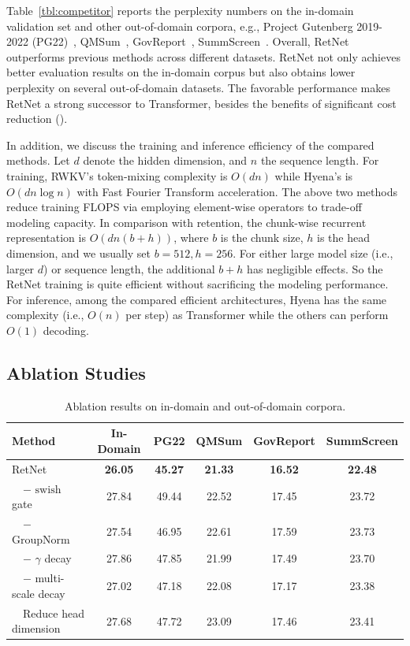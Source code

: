 \documentclass{article}
\newcommand\our{RetNet}
\begin{document}
Table~\ref{tbl:competitor} reports the perplexity numbers on the in-domain validation set and other out-of-domain corpora, e.g., Project Gutenberg 2019-2022 (PG22)~\cite{lex}, QMSum~\cite{qmsum}, GovReport~\cite{govreport}, SummScreen~\cite{summscreen,scrolls}.
Overall, \our{} outperforms previous methods across different datasets.
\our{} not only achieves better evaluation results on the in-domain corpus but also obtains lower perplexity on several out-of-domain datasets.
The favorable performance makes \our{} a strong successor to Transformer, besides the benefits of significant cost reduction ().

In addition, we discuss the training and inference efficiency of the compared methods.
Let $d$ denote the hidden dimension, and $n$ the sequence length.
For training, RWKV's token-mixing complexity is $O(dn)$ while Hyena's is $O(dn\log n)$ with Fast Fourier Transform acceleration.
The above two methods reduce training FLOPS via employing element-wise operators to trade-off modeling capacity.
In comparison with retention, the chunk-wise recurrent representation is $O(dn(b+h))$, where $b$ is the chunk size, $h$ is the head dimension, and we usually set $b=512, h=256$.
For either large model size (i.e., larger $d$) or sequence length, the additional $b+h$ has negligible effects.
So the \our{} training is quite efficient without sacrificing the modeling performance.
For inference, among the compared efficient architectures, Hyena has the same complexity (i.e., $O(n)$ per step) as Transformer while the others can perform $O(1)$ decoding.


\subsection{Ablation Studies}
\label{sec:ablation}

\begin{table}[t]
\centering
\begin{tabular}{lc|cccc}
\toprule
\textbf{Method}    & \textbf{In-Domain}      &  \textbf{PG22}   &   \textbf{QMSum}    & \textbf{GovReport} & \textbf{SummScreen}\\
\midrule
\our{} & \textbf{26.05} & \textbf{45.27} & \textbf{21.33} & \textbf{16.52} & \textbf{22.48} \\
~~$-$ $\mathrm{swish}$ gate & 27.84 & 49.44 & 22.52 & 17.45 & 23.72 \\
~~$-$ $\mathrm{GroupNorm}$ & 27.54 & 46.95 & 22.61 & 17.59 & 23.73 \\
~~$-$ $\gamma$ decay & 27.86 & 47.85 & 21.99 & 17.49 & 23.70 \\
~~$-$ multi-scale decay & 27.02 & 47.18 & 22.08 & 17.17 & 23.38 \\
~~Reduce head dimension & 27.68 & 47.72 & 23.09 & 17.46 & 23.41 \\
\bottomrule
\end{tabular}
\caption{Ablation results on in-domain and out-of-domain corpora.}
\label{tbl:ablation}
\end{table}
\end{document}
